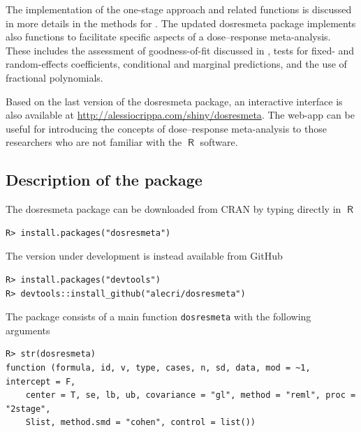 \documentclass[11pt,a4paper,twoside,openany]{book}\usepackage{knitr}
\newcommand{\pkg}[1]{{\fontseries{b}\selectfont #1}}
\DeclareMathOperator{\R}{\textsf{R}}
\begin{document}
{\noindent The implementation of the one-stage approach and related functions is discussed in more details in the methods for . 
The updated \pkg{dosresmeta} package implements also functions to facilitate specific aspects of a dose--response meta-analysis. These includes the assessment of goodness-of-fit discussed in , tests for fixed- and random-effects coefficients, conditional and marginal predictions, and the use of fractional polynomials.

Based on the last version of the \pkg{dosresmeta} package, an interactive interface is also available at \url{http://alessiocrippa.com/shiny/dosresmeta}. The web-app can be useful for introducing the concepts of dose--response meta-analysis to those researchers who are not familiar with the $\R$ software.

\subsection{Description of the package}

The \pkg{dosresmeta} package can be downloaded from CRAN by typing directly in $\R$
\begin{knitrout}\footnotesize
{}\color{fgcolor}\begin{kframe}
\begin{verbatim}
R> install.packages("dosresmeta")
\end{verbatim}
\end{kframe}
\end{knitrout}
\noindent The version under development is instead available from GitHub
\begin{knitrout}\footnotesize
{}\color{fgcolor}\begin{kframe}
\begin{verbatim}
R> install.packages("devtools")
R> devtools::install_github("alecri/dosresmeta")
\end{verbatim}
\end{kframe}
\end{knitrout}

\noindent The package consists of a main function \texttt{dosresmeta} with the following arguments
\begin{knitrout}\footnotesize
{}\color{fgcolor}\begin{kframe}
\begin{verbatim}
R> str(dosresmeta)
function (formula, id, v, type, cases, n, sd, data, mod = ~1, intercept = F, 
    center = T, se, lb, ub, covariance = "gl", method = "reml", proc = "2stage", 
    Slist, method.smd = "cohen", control = list())  
\end{verbatim}
\end{kframe}
\end{knitrout}

}
\end{document}
